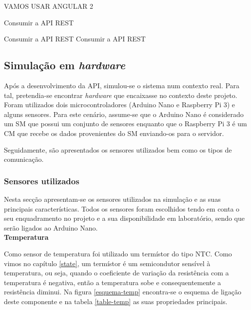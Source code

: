 VAMOS USAR ANGULAR 2




Consumir a API REST 

Consumir a API REST 
Consumir a API REST 




\newpage
\subsection{Simulação em \textit{hardware}}
\label{arq-hardw}


Após a desenvolvimento da API, simulou-se o sistema num contexto real. Para tal, pretendia-se encontrar \textit{hardware} que encaixasse no contexto deste projeto. Foram utilizados dois microcontroladores (Arduino Nano e Raspberry Pi 3) e alguns sensores. Para este cenário, assume-se que o Arduino Nano é considerado um \acl{SM} que possui um conjunto de sensores enquanto que o Raspberry Pi 3 é um \acl{CM} que recebe os dados provenientes do \acl{SM} enviando-os para o servidor.  

Seguidamente, são apresentados os sensores utilizados bem como os tipos de comunicação. 
 

\subsubsection{Sensores utilizados}

Nesta secção apresentam-se os sensores utilizados na simulação e as suas principais características. Todos os sensores foram escolhidos tendo em conta o seu enquadramento no projeto e a sua disponibilidade em laboratório, sendo que serão ligados ao Arduino Nano. \\


\textbf{Temperatura}


Como sensor de temperatura foi utilizado um termístor do tipo \ac{NTC}. Como vimos no capítulo \ref{state}, um termístor é um semicondutor sensível à temperatura, ou seja, quando o coeficiente de variação da resistência com a temperatura é negativa, então a temperatura sobe e consequentemente a resistência diminui. Na figura \ref{esquema-temp} encontra-se o esquema de ligação deste componente e na tabela \ref{table-temp} as suas propriedades principais\cite{temp-dta}. 


